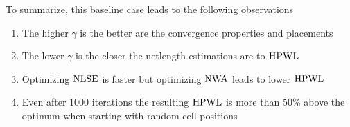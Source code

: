To summarize, this baseline case leads to the following observations
\begin{enumerate}
 \item The higher \(\gamma\) is the better are the convergence properties and placements
 \item The lower \(\gamma\) is the closer the netlength estimations are to \(\operatorname{HPWL}\)
 \item Optimizing \(\operatorname{NLSE}\) is faster but optimizing \(\operatorname{NWA}\) leads to lower \(\operatorname{HPWL}\)
 \item Even after 1000 iterations the resulting \(\operatorname{HPWL}\) is more than 50\% above the optimum
       when starting with random cell positions
\end{enumerate}
